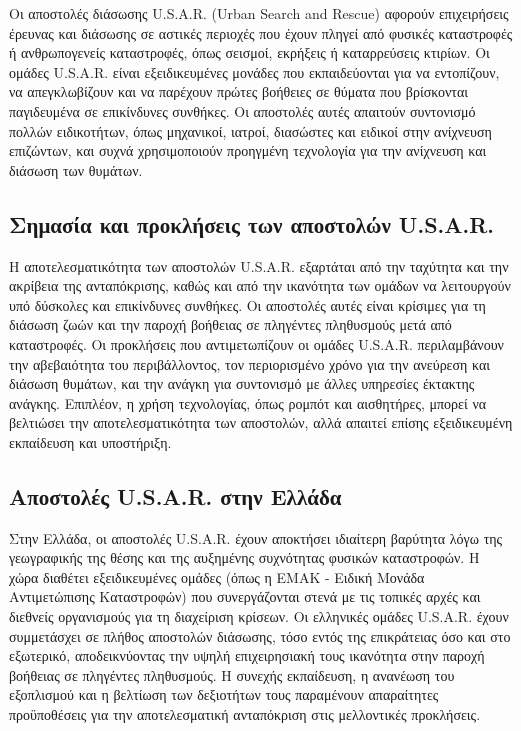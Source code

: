 \par Οι αποστολές διάσωσης U.S.A.R. (Urban Search and Rescue) αφορούν επιχειρήσεις έρευνας και διάσωσης σε αστικές περιοχές που έχουν πληγεί από φυσικές καταστροφές ή ανθρωπογενείς καταστροφές, όπως σεισμοί, εκρήξεις ή καταρρεύσεις κτιρίων. Οι ομάδες U.S.A.R. είναι εξειδικευμένες μονάδες που εκπαιδεύονται για να εντοπίζουν, να απεγκλωβίζουν και να παρέχουν πρώτες βοήθειες σε θύματα που βρίσκονται παγιδευμένα σε επικίνδυνες συνθήκες. Οι αποστολές αυτές απαιτούν συντονισμό πολλών ειδικοτήτων, όπως μηχανικοί, ιατροί, διασώστες και ειδικοί στην ανίχνευση επιζώντων, και συχνά χρησιμοποιούν προηγμένη τεχνολογία για την ανίχνευση και διάσωση των θυμάτων.  

\subsection{Σημασία και προκλήσεις των αποστολών U.S.A.R.}
Η αποτελεσματικότητα των αποστολών U.S.A.R. εξαρτάται από την ταχύτητα και την ακρίβεια της ανταπόκρισης, καθώς και από την ικανότητα των ομάδων να λειτουργούν υπό δύσκολες και επικίνδυνες συνθήκες. Οι αποστολές αυτές είναι κρίσιμες για τη διάσωση ζωών και την παροχή βοήθειας σε πληγέντες πληθυσμούς μετά από καταστροφές. Οι προκλήσεις που αντιμετωπίζουν οι ομάδες U.S.A.R. περιλαμβάνουν την αβεβαιότητα του περιβάλλοντος, τον περιορισμένο χρόνο για την ανεύρεση και διάσωση θυμάτων, και την ανάγκη για συντονισμό με άλλες υπηρεσίες έκτακτης ανάγκης. Επιπλέον, η χρήση τεχνολογίας, όπως ρομπότ και αισθητήρες, μπορεί να βελτιώσει την αποτελεσματικότητα των αποστολών, αλλά απαιτεί επίσης εξειδικευμένη εκπαίδευση και υποστήριξη.

\subsection{Αποστολές U.S.A.R. στην Ελλάδα}
Στην Ελλάδα, οι αποστολές U.S.A.R. έχουν αποκτήσει ιδιαίτερη βαρύτητα λόγω της γεωγραφικής της θέσης και της αυξημένης συχνότητας φυσικών καταστροφών. Η χώρα διαθέτει εξειδικευμένες ομάδες (όπως η ΕΜΑΚ - Ειδική Μονάδα Αντιμετώπισης Καταστροφών) που συνεργάζονται στενά με τις τοπικές αρχές και διεθνείς οργανισμούς για τη διαχείριση κρίσεων. Οι ελληνικές ομάδες U.S.A.R. έχουν συμμετάσχει σε πλήθος αποστολών διάσωσης, τόσο εντός της επικράτειας όσο και στο εξωτερικό, αποδεικνύοντας την υψηλή επιχειρησιακή τους ικανότητα στην παροχή βοήθειας σε πληγέντες πληθυσμούς. Η συνεχής εκπαίδευση, η ανανέωση του εξοπλισμού και η βελτίωση των δεξιοτήτων τους παραμένουν απαραίτητες προϋποθέσεις για την αποτελεσματική ανταπόκριση στις μελλοντικές προκλήσεις.

